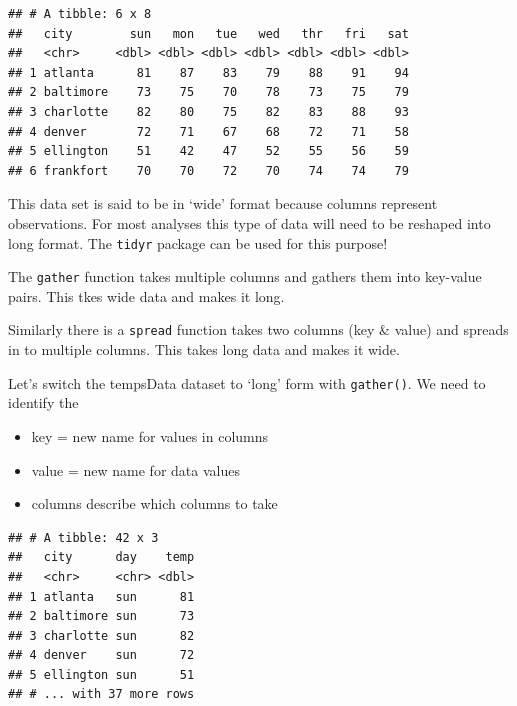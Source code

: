 \documentclass[
]{book}
\newenvironment{Shaded}{\begin{snugshade}}{\end{snugshade}}
\newcommand{\DataTypeTok}[1]{\textcolor[rgb]{0.13,0.29,0.53}{#1}}
\newcommand{\DecValTok}[1]{\textcolor[rgb]{0.00,0.00,0.81}{#1}}
\newcommand{\KeywordTok}[1]{\textcolor[rgb]{0.13,0.29,0.53}{\textbf{#1}}}
\newcommand{\NormalTok}[1]{#1}
\newcommand{\OperatorTok}[1]{\textcolor[rgb]{0.81,0.36,0.00}{\textbf{#1}}}
\newcommand{\StringTok}[1]{\textcolor[rgb]{0.31,0.60,0.02}{#1}}
\theoremstyle{definition}
\theoremstyle{definition}
\theoremstyle{definition}
\theoremstyle{remark}
\begin{document}
\begin{verbatim}
## # A tibble: 6 x 8
##   city        sun   mon   tue   wed   thr   fri   sat
##   <chr>     <dbl> <dbl> <dbl> <dbl> <dbl> <dbl> <dbl>
## 1 atlanta      81    87    83    79    88    91    94
## 2 baltimore    73    75    70    78    73    75    79
## 3 charlotte    82    80    75    82    83    88    93
## 4 denver       72    71    67    68    72    71    58
## 5 ellington    51    42    47    52    55    56    59
## 6 frankfort    70    70    72    70    74    74    79
\end{verbatim}

This data set is said to be in `wide' format because columns represent observations. For most analyses this type of data will need to be reshaped into long format. The \texttt{tidyr} package can be used for this purpose!

The \texttt{gather} function takes multiple columns and gathers them into key-value pairs. This tkes wide data and makes it long.

Similarly there is a \texttt{spread} function takes two columns (key \& value) and spreads in to multiple columns. This takes long data and makes it wide.

Let's switch the tempsData dataset to `long' form with \texttt{gather()}. We need to identify the

\begin{itemize}
\item
  key = new name for values in columns
\item
  value = new name for data values
\item
  columns describe which columns to take
\end{itemize}

\begin{Shaded}
\end{Shaded}

\begin{verbatim}
## # A tibble: 42 x 3
##   city      day    temp
##   <chr>     <chr> <dbl>
## 1 atlanta   sun      81
## 2 baltimore sun      73
## 3 charlotte sun      82
## 4 denver    sun      72
## 5 ellington sun      51
## # ... with 37 more rows
\end{verbatim}
\end{document}

